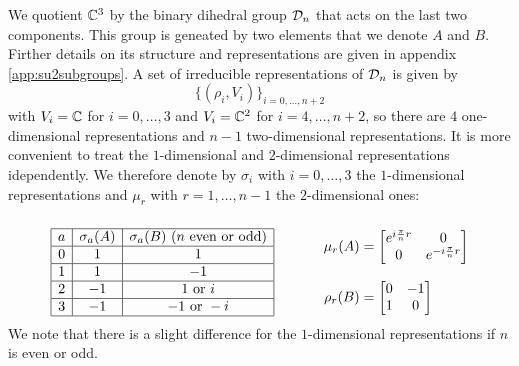        We quotient $\mathbb{C}^3$ by the binary dihedral group $\mathcal{D}_n$ that acts on the last two components. This group is geneated by two elements that we denote $A$ and $B$. Firther details on its structure and representations are given in appendix \ref{app:su2subgroups}. A set of irreducible representations of $\mathcal{D}_n$ is given by
        \begin{equation}
            \{(\rho_i,V_i)\}_{i=0,\dots,n+2}
        \end{equation}
        with $V_i=\mathbb{C}$ for $i=0,\dots,3$ and $V_i=\mathbb{C}^2$ for $i=4,\dots,n+2$, so there are $4$ one-dimensional representations and $n-1$ two-dimensional representations. It is more convenient to treat the $1$-dimensional and $2$-dimensional representations idependently. We therefore denote by $\sigma_i$ with $i=0,\dots,3$ the $1$-dimensional representations and $\mu_r$ with $r=1,\dots,n-1$ the $2$-dimensional ones:
        \begin{equation*}
        \begin{array}{cc}
            \multirow{7}{*}{$\begin{array}{|c|c|c|}
                \hline
                a & \sigma_a(A) & \sigma_a(B) \text{ ($n$ even or odd)} \\
                \hline
                0 & 1 & 1\\ \hline
                1 & 1 & -1 \\ \hline
                2 & -1 & 1 \text{ or } i \\ \hline
                3 & -1 & -1 \text{ or } -i \\
                \hline
            \end{array}$} & \\
            & {\hspace{0.9cm}\mu_r(A) = 
            \begin{bmatrix}
                e^{i\frac{\pi}{n}r} & 0\\
                0 & e^{-i\frac{\pi}{n}r} 
            \end{bmatrix}}\\
            & \\
            & {\rho_r(B) = 
            \begin{bmatrix}
                0 & -1 \\
                1 & 0
            \end{bmatrix}}
        \end{array}
        \end{equation*}
        We note that there is a slight difference for the $1$-dimensional representations if $n$ is even or odd.
        
